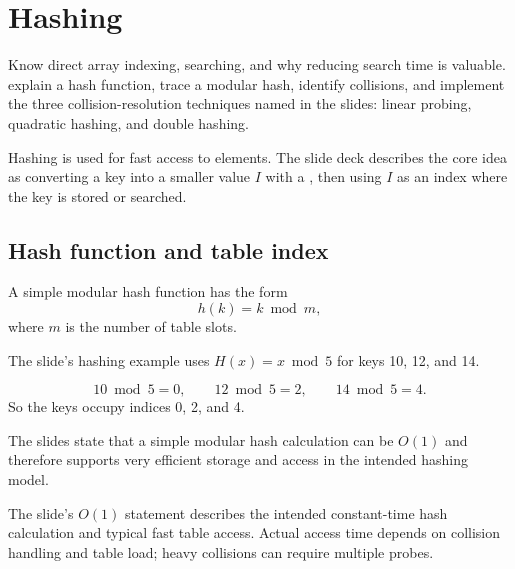 \chapter{Hashing}
\label{ch:hashing}

\chapterguide%
  {Know direct array indexing, searching, and why reducing search time is valuable.}
  {explain a hash function, trace a modular hash, identify collisions, and implement the three collision-resolution techniques named in the slides: linear probing, quadratic hashing, and double hashing.}

Hashing is used for fast access to elements. The slide deck describes the core idea as converting a key into a smaller value $I$ with a , then using $I$ as an index where the key is stored or searched.

\section{Hash function and table index}

A simple modular hash function has the form
\[
h(k)=k\bmod m,
\]
where $m$ is the number of table slots.

The slide's hashing example uses $H(x)=x\bmod5$ for keys 10, 12, and 14.

\begin{workedexample}
\[
10\bmod5=0,\qquad 12\bmod5=2,\qquad 14\bmod5=4.
\]
So the keys occupy indices 0, 2, and 4.
\end{workedexample}

\begin{mlfigure}
\end{mlfigure}

The slides state that a simple modular hash calculation can be $O(1)$ and therefore supports very efficient storage and access in the intended hashing model.

\begin{clarification}
The slide's $O(1)$ statement describes the intended constant-time hash calculation and typical fast table access. Actual access time depends on collision handling and table load; heavy collisions can require multiple probes.
\end{clarification}

